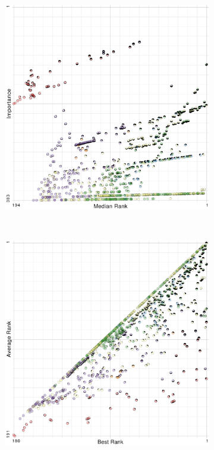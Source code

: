 \begin{figure}[ht]
\begin{subfigure}{0.24\linewidth}
\includegraphics[width=\linewidth]{infuse/mi}
\label{subfig:mi}
\end{subfigure}%
~%
\begin{subfigure}{0.24\linewidth}
\includegraphics[width=\linewidth]{infuse/ba}

\end{subfigure}
\end{figure}
